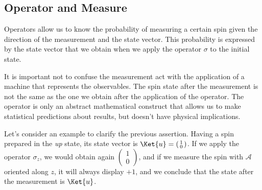 %
%
\subsection{Operator and Measure}
Operators allow us to know the probability of measuring a certain spin given the direction of the measurement and the state vector. This probability is expressed by the state vector that we obtain when we apply the operator $\sigma$ to the initial state.

It is important not to confuse the measurement act with the application of a machine that represents the observables. The spin state after the measurement is not the same as the one we obtain after the application of the operator. The operator is only an abstract mathematical construct that allows us to make statistical predictions about results, but doesn't have physical implications.

Let's consider an example to clarify the previous assertion. Having a spin prepared in the \emph{up} state, its state vector is $\Ket{u} = \left(\begin{smallmatrix}1\\0\end{smallmatrix}\right)$. If we apply the operator $\sigma_z$, we would obtain again $\left(\begin{smallmatrix}1\\0\end{smallmatrix}\right)$, and if we measure the spin with $\mathcal{A}$ oriented along $z$, it will always display $+1$, and we conclude that the state after the measurement is $\Ket{u}$.

